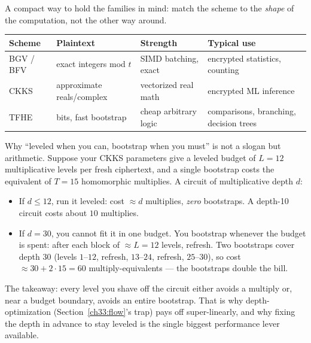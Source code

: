 A compact way to hold the families in mind: match the scheme to the \emph{shape} of the computation, not the other way around.

\begin{center}
\small
\begin{tabular}{@{}llll@{}}
\toprule
\textbf{Scheme} & \textbf{Plaintext} & \textbf{Strength} & \textbf{Typical use} \\
\midrule
BGV / BFV & exact integers mod $t$ & SIMD batching, exact & encrypted statistics, counting \\
CKKS & approximate reals/complex & vectorized real math & encrypted ML inference \\
TFHE & bits, fast bootstrap & cheap arbitrary logic & comparisons, branching, decision trees \\
\bottomrule
\end{tabular}
\end{center}

\begin{example}
\label{ch33:bootstrap-economics}
Why ``leveled when you can, bootstrap when you must'' is not a slogan but arithmetic. Suppose your CKKS parameters give a leveled budget of $L = 12$ multiplicative levels per fresh ciphertext, and a single bootstrap costs the equivalent of $T = 15$ homomorphic multiplies. A circuit of multiplicative depth $d$:
\begin{itemize}
  \item If $d \le 12$, run it leveled: cost $\approx d$ multiplies, \emph{zero} bootstraps. A depth-10 circuit costs about $10$ multiplies.
  \item If $d = 30$, you cannot fit it in one budget. You bootstrap whenever the budget is spent: after each block of $\approx L=12$ levels, refresh. Two bootstraps cover depth $30$ (levels $1$--$12$, refresh, $13$--$24$, refresh, $25$--$30$), so cost $\approx 30 + 2\cdot 15 = 60$ multiply-equivalents --- the bootstraps double the bill.
\end{itemize}
The takeaway: every level you shave off the circuit either avoids a multiply or, near a budget boundary, avoids an entire bootstrap. That is why depth-optimization (Section~\ref{ch33:flow}'s trap) pays off super-linearly, and why fixing the depth in advance to stay leveled is the single biggest performance lever available.
\end{example}


